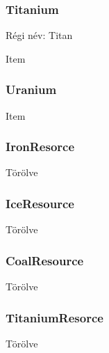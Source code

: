\documentclass[../../projlab]{subfiles}
\begin{document}
\subsubsection{Titanium}
\begin{class-template-responsibility}
    Régi név: Titan
\end{class-template-responsibility}
\begin{class-template-baseclass}
    Item
\end{class-template-baseclass}

\subsubsection{Uranium}
\begin{class-template-baseclass}
    Item
\end{class-template-baseclass}
\begin{class-template-attribute}
\end{class-template-attribute}

\subsubsection{IronResorce}
\begin{class-template-responsibility}
    Törölve
\end{class-template-responsibility}

\subsubsection{IceResource}
\begin{class-template-responsibility}
    Törölve
\end{class-template-responsibility}

\subsubsection{CoalResource}
\begin{class-template-responsibility}
    Törölve
\end{class-template-responsibility}

\subsubsection{TitaniumResorce}
\begin{class-template-responsibility}
    Törölve
\end{class-template-responsibility}
\end{document}
